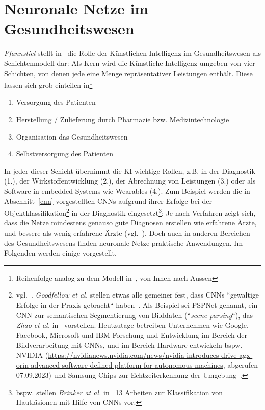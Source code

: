 \chapter{Neuronale Netze im Gesundheitswesen}\label{ch:gesundheitswesen}



\textit{Pfannstiel} stellt in~\cite[35, Abb. 1.14]{Pfa22} die Rolle der Künstlichen Intelligenz im Gesundheitswesen als Schichtenmodell dar: Als Kern wird die Künstliche Intelligenz umgeben von vier Schichten, von denen jede eine Menge repräsentativer Leistungen enthält.
Diese lassen sich grob einteilen in\footnote{
    Reihenfolge analog zu dem Modell in~\cite{Pfa22}, von Innen nach Aussen
}

\begin{enumerate}
    \item Versorgung des Patienten
    \item Herstellung / Zulieferung durch Pharmazie bzw. Medizintechnologie
    \item Organisation das Gesundheitswesen
    \item Selbstversorgung des Patienten
\end{enumerate}


In jeder dieser Schicht übernimmt die KI wichtige Rollen, z.B. in der Diagnostik (1.), der Wirkstoffentwicklung (2.), der Abrechnung von Leistungen (3.) oder als Software in embedded Systems wie Wearables (4.). Zum Beispiel werden die in Abschnitt~\ref{cnn} vorgestellten CNNs aufgrund ihrer Erfolge bei der Objektklassifikation\footnote{
    vgl.~\cite[330]{Ert21b}. \textit{Goodfellow et al.} stellen etwas alle gemeiner fest, dass CNNs ``gewaltige Erfolge in der Praxis gebracht`` haben~\cite[369]{GBC18}. Als Beispiel sei PSPNet genannt, ein CNN zur semantischen Segmentierung von Bilddaten (``\textit{scene parsing}``), das \textit{Zhao et al.} in~\cite{ZSQ+17} vorstellen. Heutzutage betreiben Unternehmen wie Google, Facebook, Microsoft und IBM Forschung und Entwicklung im Bereich der Bildverarbeitung mit CNNs, und im Bereich Hardware entwickeln bspw. NVIDIA (\url{https://nvidianews.nvidia.com/news/nvidia-introduces-drive-agx-orin-advanced-software-defined-platform-for-autonomous-machines}, abgerufen 07.09.2023) und Samsung Chips zur Echtzeiterkennung der Umgebung~\cite[440]{LBH15}.
} in der Diagnostik eingesetzt\footnote{
    bspw. stellen \textit{Brinker at al.} in~\cite{BHU+18} 13 Arbeiten zur Klassifikation von Hautläsionen mit Hilfe von CNNs vor.
}: Je nach Verfahren zeigt sich, dass die Netze mindestens genauso gute Diagnosen erstellen wie erfahrene Ärzte, und bessere als wenig erfahrene Ärzte (vgl.~\cite[7]{SZJ+19}). Doch auch in anderen Bereichen des Gesundheitswesens finden neuronale Netze praktische Anwendungen. Im Folgenden werden einige vorgestellt.



